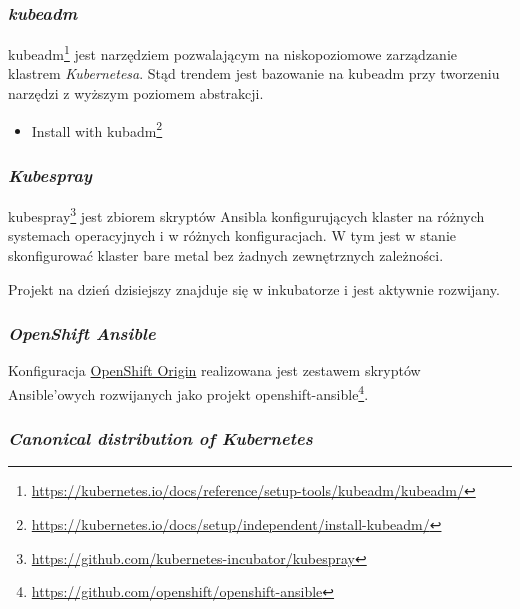 \documentclass[a4paper,12pt,twoside,openany]{report}
\providecommand{\tightlist}{%
  \setlength{\itemsep}{0pt}\setlength{\parskip}{0pt}}
\DeclareRobustCommand{\href}[2]{#2\footnote{\url{#1}}}
\begin{document}
\hypertarget{kubeadm}{%
\subsubsection{\texorpdfstring{\emph{kubeadm}}{kubeadm}}\label{kubeadm}}

\href{https://kubernetes.io/docs/reference/setup-tools/kubeadm/kubeadm/}{kubeadm}
jest narzędziem pozwalającym na niskopoziomowe zarządzanie klastrem
\emph{Kubernetesa}. Stąd trendem jest bazowanie na kubeadm przy
tworzeniu narzędzi z wyższym poziomem abstrakcji.

\begin{itemize}
\tightlist
\item
  \href{https://kubernetes.io/docs/setup/independent/install-kubeadm/}{Install
  with kubadm}
\end{itemize}

\hypertarget{kubespray}{%
\subsubsection{\texorpdfstring{\emph{Kubespray}}{Kubespray}}\label{kubespray}}

\href{https://github.com/kubernetes-incubator/kubespray}{kubespray} jest
zbiorem skryptów Ansibla konfigurujących klaster na różnych systemach
operacyjnych i w różnych konfiguracjach. W tym jest w stanie
skonfigurować klaster bare metal bez żadnych zewnętrznych zależności.

Projekt na dzień dzisiejszy znajduje się w inkubatorze i jest aktywnie
rozwijany.

\hypertarget{openshift-ansible}{%
\subsubsection{\texorpdfstring{\emph{OpenShift
Ansible}}{OpenShift Ansible}}\label{openshift-ansible}}

Konfiguracja \protect\hyperlink{openshift-origin}{OpenShift Origin}
realizowana jest zestawem skryptów Ansible'owych rozwijanych jako
projekt
\href{https://github.com/openshift/openshift-ansible}{openshift-ansible}.

\hypertarget{canonical-distribution-of-kubernetes}{%
\subsubsection{\texorpdfstring{\emph{Canonical distribution of
Kubernetes}}{Canonical distribution of Kubernetes}}\label{canonical-distribution-of-kubernetes}}
\end{document}
